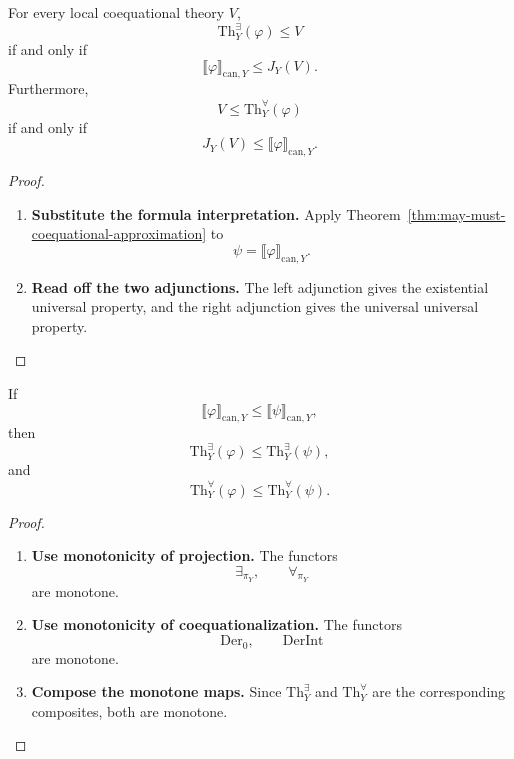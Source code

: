 \begin{theorem}
\label{thm:formula-generated-universal-properties}
For every local coequational theory \(V\),
\[
  \mathrm{Th}^{\exists}_Y(\varphi)\leq V
\]
if and only if
\[
  \llbracket\varphi\rrbracket_{\mathrm{can},Y}
  \leq
  J_Y(V).
\]
Furthermore,
\[
  V\leq\mathrm{Th}^{\forall}_Y(\varphi)
\]
if and only if
\[
  J_Y(V)\leq
  \llbracket\varphi\rrbracket_{\mathrm{can},Y}.
\]
\end{theorem}

\begin{proof}
\leavevmode
\begin{enumerate}
  \item \textbf{Substitute the formula interpretation.}
  Apply Theorem~\ref{thm:may-must-coequational-approximation} to
  \[
    \psi=\llbracket\varphi\rrbracket_{\mathrm{can},Y}.
  \]

  \item \textbf{Read off the two adjunctions.}
  The left adjunction gives the existential universal property, and the
  right adjunction gives the universal universal property.
\end{enumerate}
\end{proof}

\begin{proposition}[Monotonicity]
\label{prop:formula-generated-monotonicity}
If
\[
  \llbracket\varphi\rrbracket_{\mathrm{can},Y}
  \leq
  \llbracket\psi\rrbracket_{\mathrm{can},Y},
\]
then
\[
  \mathrm{Th}^{\exists}_Y(\varphi)
  \leq
  \mathrm{Th}^{\exists}_Y(\psi),
\]
and
\[
  \mathrm{Th}^{\forall}_Y(\varphi)
  \leq
  \mathrm{Th}^{\forall}_Y(\psi).
\]
\end{proposition}

\begin{proof}
\leavevmode
\begin{enumerate}
  \item \textbf{Use monotonicity of projection.}
  The functors
  \[
    \exists_{\pi_Y},
    \qquad
    \forall_{\pi_Y}
  \]
  are monotone.

  \item \textbf{Use monotonicity of coequationalization.}
  The functors
  \[
    \mathrm{Der}_0,
    \qquad
    \mathrm{DerInt}
  \]
  are monotone.

  \item \textbf{Compose the monotone maps.}
  Since \(\mathrm{Th}^{\exists}_Y\) and
  \(\mathrm{Th}^{\forall}_Y\) are the corresponding composites, both are
  monotone.
\end{enumerate}
\end{proof}

